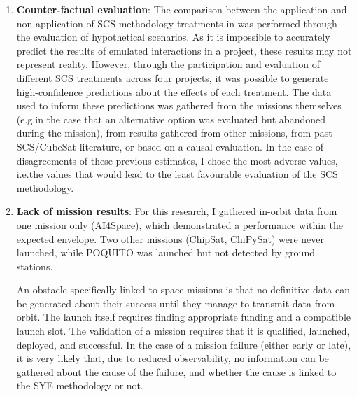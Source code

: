 \documentclass[a4paper,nobib,justified,final]{tufte-book}
\begin{document}
\begin{fullwidth}
\begin{enumerate}

	\item [Threat 5.] %
	\textbf{Counter-factual evaluation}:
	The comparison between the application and non-application of \acs{SCS} methodology treatments in  was performed through the evaluation of hypothetical scenarios.
	As it is impossible to accurately predict the results of emulated interactions in a project, these results may not represent reality.
	However, through the participation and evaluation of different \acs{SCS} treatments across four projects, it was possible to generate high-confidence predictions about the effects of each treatment.
	The data used to inform these predictions was gathered from the missions themselves (e.g.\@ in the case that an alternative option was evaluated but abandoned during the mission), from results gathered from other missions, from past \acs{SCS}/CubeSat literature, or based on a causal evaluation. In the case of disagreements of these previous estimates, I chose the most adverse values, i.e.\@ the values that would lead to the least favourable evaluation of the \acs{SCS} methodology.
	
	\item [Threat 6.] %
	\textbf{Lack of mission results}:
	For this research, I gathered in-orbit data from one mission only (AI4Space), which demonstrated a performance within the expected envelope. Two other missions (ChipSat, ChiPySat) were never launched, while POQUITO was launched but not detected by ground stations.

	An obstacle specifically linked to space missions is that no definitive data can be generated about their success until they manage to transmit data from orbit.
	The launch itself requires finding appropriate funding and a compatible launch slot.
	The validation of a mission requires that it is qualified, launched, deployed, and successful.	In the case of a mission failure (either early or late), it is very likely that, due to reduced observability, no information can be gathered about the cause of the failure, and whether the cause is linked to the \acl{SYE} methodology or not.


\end{enumerate}
\end{fullwidth}
\end{document}
